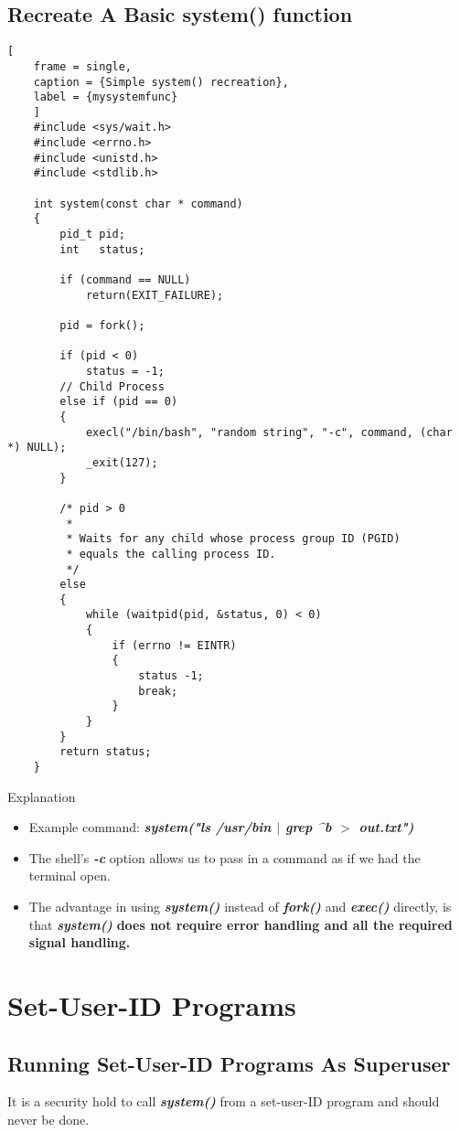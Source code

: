 \documentclass{article}
\newcommand\be[1]{\textbf{\emph{#1}}}
\begin{document}
\subsection{Recreate A Basic system() function}
\begin{lstlisting}[
    frame = single,
    caption = {Simple system() recreation},
    label = {mysystemfunc}
    ]
    #include <sys/wait.h>
    #include <errno.h>
    #include <unistd.h>
    #include <stdlib.h>

    int system(const char * command)
    {
        pid_t pid;
        int   status;

        if (command == NULL)
            return(EXIT_FAILURE);
        
        pid = fork();

        if (pid < 0) 
            status = -1;
        // Child Process
        else if (pid == 0)
        {
            execl("/bin/bash", "random string", "-c", command, (char *) NULL);
            _exit(127);
        }

        /* pid > 0
         *
         * Waits for any child whose process group ID (PGID) 
         * equals the calling process ID.
         */
        else 
        {
            while (waitpid(pid, &status, 0) < 0)
            {
                if (errno != EINTR)
                {
                    status -1;
                    break;
                }
            }
        }
        return status;
    }
\end{lstlisting}

Explanation
\begin{itemize}
    \item Example command: \be{system("ls /usr/bin $|$ grep \string^b $>$ out.txt")}
    \item The shell's \be{-c} option allows us to pass in a command as if we had the terminal open.
    \item The advantage in using \be{system()} instead of \be{fork()} and \be{exec()} directly,
        is that \be{system()} \textbf{does not require error handling and all the required signal handling.}
\end{itemize}


\section{Set-User-ID Programs}
\subsection{Running Set-User-ID Programs As Superuser}
It is a security hold to call \be{system()} from a set-user-ID program and should never be done. \newline
\end{document}
